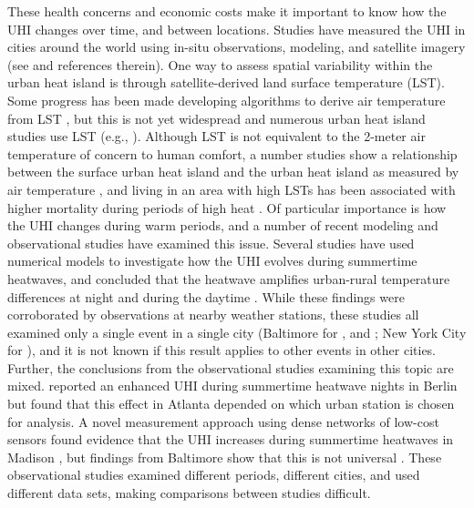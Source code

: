 These health concerns and economic costs make it important to know how the UHI changes over time, and between locations.  Studies have measured the UHI in cities around the world using  in-situ observations,  modeling, and satellite imagery 
(see \cite{arnfield2003two} and references therein). 
One way to assess spatial variability within the urban heat island is through satellite-derived land surface temperature (LST). Some progress has been made developing algorithms to derive air temperature from LST \citep{vancouverLST, sun2005air, Kloog2014132}, but this is not yet widespread and numerous urban heat island studies use LST (e.g., \citet{natureUHIronsmith, Nichol2009276, xu2015monitoring, ho2016comparison, white2013validating}). 
Although LST is not equivalent to the 2-meter air temperature of concern to human comfort, a number studies show a relationship between the surface urban heat island and the urban heat island as measured by air temperature \citep{VoogtOke2003, arnfield, Nichol2012153}, and living in an area with high LSTs has been associated with higher mortality during periods of high heat \citep{lstUHImortality, laaidi2012impact, harlan2013neighborhood, hondula2012fine}. 
Of particular importance is how the UHI changes during warm periods, and a  number of recent modeling and observational studies have examined this issue. 
Several studies have used numerical models to investigate how the UHI evolves during summertime heatwaves, and concluded that the heatwave amplifies urban-rural temperature differences at night and during the daytime \citep{li2013synergistic,ramamurthy2017impact,li2014effectiveness,li2015contrasting}. While these findings were corroborated by observations at nearby weather stations, these studies all examined only a single event in a single city  (Baltimore for \cite{li2013synergistic}, \cite{li2014effectiveness} and \cite{li2015contrasting}; New York City for \cite{ramamurthy2017impact}), and it is not known if this result applies to other events in other cities.
Further, the conclusions from the observational studies examining this topic are mixed. 
\cite{gabriel2011urban} reported an enhanced UHI during summertime heatwave nights in Berlin but \cite{zhou2010atlanta} found that this effect in Atlanta depended on which urban station is chosen for analysis. A novel measurement approach using dense networks of low-cost sensors found evidence that the UHI increases during summertime heatwaves in Madison \citep{schatz2015urban}, but findings from Baltimore show that this is not universal \citep{scott2016intra}.  These observational studies examined different periods, different cities, and used different data sets, making comparisons between studies difficult. 

